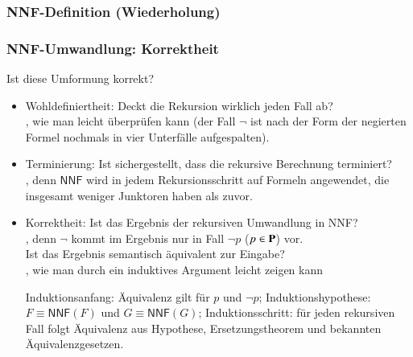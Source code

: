 \documentclass[aspectratio=1610,onlymath]{beamer}
\let\beameroriginaldoublebackslash\\
\let\\=\beameroriginaldoublebackslash
\begin{document}
\begin{frame}\frametitle{NNF-Definition (Wiederholung)}


\end{frame}

\begin{frame}\frametitle{NNF-Umwandlung: Korrektheit}

Ist diese Umformung korrekt?
\begin{itemize}
\item \alert{Wohldefiniertheit:} Deckt die Rekursion wirklich jeden Fall ab?\\\pause
	, wie man leicht überprüfen kann (der Fall $\neg$ ist nach der Form der negierten Formel nochmals in vier Unterfälle aufgespalten).\pause
\item \alert{Terminierung:} Ist sichergestellt, dass die rekursive Berechnung terminiert?\\\pause
	, denn $\textsf{NNF}$ wird in jedem Rekursionsschritt auf Formeln angewendet, die insgesamt weniger Junktoren haben als zuvor.\pause
\item \alert{Korrektheit:} Ist das Ergebnis der rekursiven Umwandlung in NNF?\\\pause
	, denn $\neg$ kommt im Ergebnis nur in Fall $\neg p$ ($p\in\textbf{\textcolor{black}{P}}$) vor.\\\pause
	Ist das Ergebnis semantisch äquivalent zur Eingabe?\\\pause
	, wie man durch ein induktives Argument leicht zeigen kann\\
	{\tiny Induktionsanfang: Äquivalenz gilt für $p$ und $\neg p$; Induktionshypothese: $F\equiv \textsf{NNF}(F)$ und $G\equiv \textsf{NNF}(G)$; Induktionsschritt: für jeden rekursiven Fall folgt Äquivalenz aus Hypothese, Ersetzungstheorem und bekannten Äquivalenzgesetzen.
	
	}
\end{itemize}\pause


\end{frame}
\end{document}
